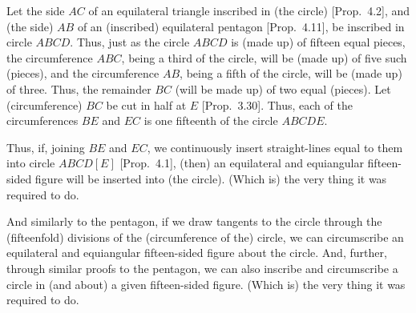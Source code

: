 \begin{Parallel}{}{}
{Let the side $AC$ of an equilateral triangle inscribed in (the circle) [Prop.~4.2],
and (the side) $AB$ of an (inscribed) equilateral pentagon [Prop.~4.11],
 be inscribed in circle $ABCD$.
 Thus,   just as the circle $ABCD$ is (made up) of fifteen equal pieces, the
 circumference $ABC$, being a third of the circle, will be (made up) of five
 such (pieces), and the
 circumference $AB$, being a fifth of the circle, will be (made up) of  three.
 Thus, the remainder $BC$ (will be made up) of two equal (pieces).
 Let (circumference) $BC$ be cut in half at $E$ [Prop.~3.30].
 Thus, each of the circumferences $BE$ and $EC$ is one fifteenth of the circle
 $ABCDE$.
 
 Thus, if, joining $BE$ and $EC$, we continuously insert straight-lines
 equal to them into circle $ABCD[E]$ [Prop.~4.1],
 (then) an equilateral and equiangular fifteen-sided figure will be
 inserted into (the circle). (Which is) the very thing it was required to do.
 
 And similarly to the pentagon, if we draw  tangents to the circle through
the (fifteenfold) divisions of the (circumference of the) circle, we can
circumscribe an equilateral and equiangular fifteen-sided figure about
the circle. 
 And, further, through similar proofs to the  pentagon,
 we can also inscribe and circumscribe  a circle in (and about)  a given fifteen-sided 
  figure. (Which is) the very thing it was required to do.}
\end{Parallel}
